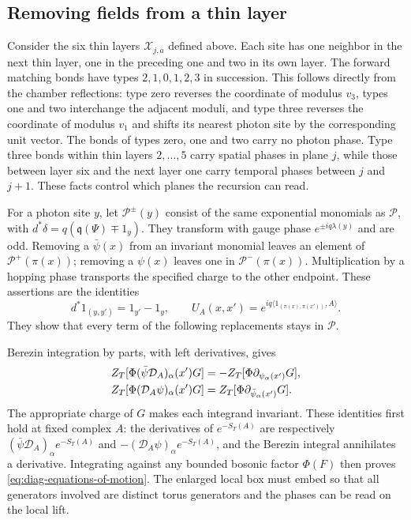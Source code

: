 \documentclass[11pt,letterpaper,reqno]{amsart}
\begin{document}
\subsection{Removing fields from a thin layer}\label{subsec:diag-fermion-recursion}

Consider the six thin layers $\mathcal X_{j,a}$ defined above.
Each site has one neighbor in the next thin layer, one in the
preceding one and two in its own layer. The forward matching
bonds have types $2,1,0,1,2,3$ in succession. This follows
directly from the chamber reflections: type zero reverses
the coordinate of modulus $v_3$, types one and two interchange
the adjacent moduli, and type three reverses the coordinate of
modulus $v_1$ and shifts its nearest photon site by the corresponding
unit vector. The bonds of types zero, one and two carry no photon
phase. Type three bonds within thin layers $2,\ldots,5$ carry
spatial phases in plane $j$, while those between layer six and
the next layer one carry temporal phases between $j$ and $j+1$.
These facts control which planes the recursion can read.

For a photon site $y$, let $\mathcal P^\pm(y)$ consist of the
same exponential monomials as $\mathcal P$, with
$d^*\delta=q(\mathfrak q(\Psi)\mp1_y)$. They transform with
gauge phase $e^{\pm iq\lambda(y)}$ and are odd. Removing a
$\bar\psi(x)$ from an invariant monomial leaves an element of
$\mathcal P^+(\pi(x))$; removing a $\psi(x)$ leaves one in
$\mathcal P^-(\pi(x))$. Multiplication by a hopping phase transports
the specified charge to the other endpoint. These assertions
are the identities
\[
 d^*1_{(y,y')}=1_{y'}-1_y,\qquad
 U_A(x,x')=e^{iq\langle1_{(\pi(x),\pi(x'))},A\rangle}.
\]
They show that every term of the following replacements stays
in $\mathcal P$.

Berezin integration by parts, with left derivatives, gives
\begin{align}\label{eq:diag-equations-of-motion}
 Z_T[\Phi(\bar\psi \mathcal D_A)_\alpha(x')G]
       &=-Z_T[\Phi\partial_{\psi_\alpha(x')}G],\notag\\
 Z_T[\Phi(\mathcal D_A\psi)_\alpha(x')G]
       &= Z_T[\Phi\partial_{\bar\psi_\alpha(x')}G].
\end{align}
The appropriate charge of $G$ makes each integrand invariant.
These identities first hold at fixed complex $A$: the
derivatives of $e^{-S_T(A)}$ are respectively
$(\bar\psi \mathcal D_A)_\alpha e^{-S_T(A)}$ and
$-(\mathcal D_A\psi)_\alpha e^{-S_T(A)}$, and the Berezin integral
annihilates a derivative. Integrating against any bounded
bosonic factor $\Phi(F)$ then proves
\eqref{eq:diag-equations-of-motion}. The enlarged local box
must embed so that all generators involved are distinct torus
generators and the phases can be read on the local lift.
\end{document}

